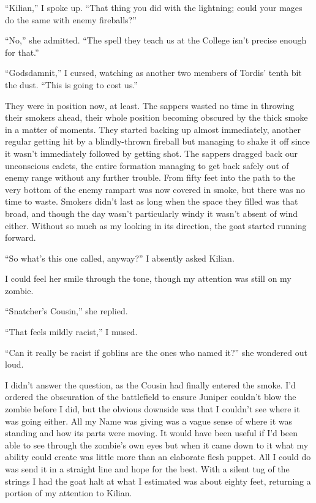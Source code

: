 \documentclass[12pt, openany]{book}
\begin{document}
“Kilian,” I spoke up. “That thing you did with the lightning; could your mages do the same with enemy fireballs?”

“No,” she admitted. “The spell they teach us at the College isn’t precise enough for that.”

“Godsdamnit,” I cursed, watching as another two members of Tordis’ tenth bit the dust. “This is going to cost us.”

They were in position now, at least. The sappers wasted no time in throwing their smokers ahead, their whole position becoming obscured by the thick smoke in a matter of moments. They started backing up almost immediately, another regular getting hit by a blindly-thrown fireball but managing to shake it off since it wasn’t immediately followed by getting shot. The sappers dragged back our unconscious cadets, the entire formation managing to get back safely out of enemy range without any further trouble. From fifty feet into the path to the very bottom of the enemy rampart was now covered in smoke, but there was no time to waste. Smokers didn’t last as long when the space they filled was that broad, and though the day wasn’t particularly windy it wasn’t absent of wind either. Without so much as my looking in its direction, the goat started running forward.

“So what’s this one called, anyway?” I absently asked Kilian.

I could feel her smile through the tone, though my attention was still on my zombie.

“Snatcher’s Cousin,” she replied.

“That feels mildly racist,” I mused.

“Can it really be racist if goblins are the ones who named it?” she wondered out loud.

I didn’t answer the question, as the Cousin had finally entered the smoke. I’d ordered the obscuration of the battlefield to ensure Juniper couldn’t blow the zombie before I did, but the obvious downside was that I couldn’t see where it was going either. All my Name was giving was a vague sense of where it was standing and how its parts were moving. It would have been useful if I’d been able to see through the zombie’s own eyes but when it came down to it what my ability could create was little more than an elaborate flesh puppet. All I could do was send it in a straight line and hope for the best. With a silent tug of the strings I had the goat halt at what I estimated was about eighty feet, returning a portion of my attention to Kilian.
\end{document}

